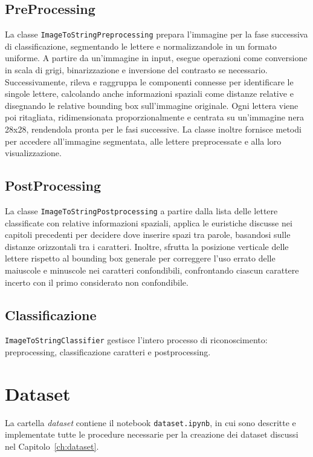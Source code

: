 \subsection*{PreProcessing}
La classe \texttt{ImageToStringPreprocessing} prepara l'immagine per la fase successiva di classificazione, segmentando le lettere e normalizzandole in un formato uniforme. A partire da un'immagine in input, esegue operazioni come conversione in scala di grigi, binarizzazione e inversione del contrasto se necessario. 
Successivamente, rileva e raggruppa le componenti connesse per identificare le singole lettere, calcolando anche informazioni spaziali come distanze relative e disegnando le relative bounding box sull'immagine originale.
Ogni lettera viene poi ritagliata, ridimensionata proporzionalmente e centrata su un'immagine nera 28x28, rendendola pronta per le fasi successive. La classe inoltre fornisce metodi per accedere all'immagine segmentata, alle lettere preprocessate e alla loro visualizzazione.


\subsection*{PostProcessing}
La classe \texttt{ImageToStringPostprocessing} a partire dalla lista delle lettere classificate con relative informazioni spaziali, applica le euristiche discusse nei capitoli precedenti per decidere dove inserire spazi tra parole, basandosi sulle distanze orizzontali tra i caratteri. Inoltre, sfrutta la posizione verticale delle lettere rispetto al bounding box generale per correggere l'uso errato delle maiuscole e minuscole nei caratteri confondibili, confrontando ciascun carattere incerto con il primo considerato non confondibile.

\subsection*{Classificazione}
\texttt{ImageToStringClassifier} gestisce l'intero processo di riconoscimento: preprocessing, classificazione caratteri e postprocessing.

\section{Dataset}
La cartella \emph{dataset} contiene il notebook \texttt{dataset.ipynb}, in cui sono descritte e implementate tutte le procedure necessarie per la creazione dei dataset discussi nel Capitolo~\ref{ch:dataset}.

